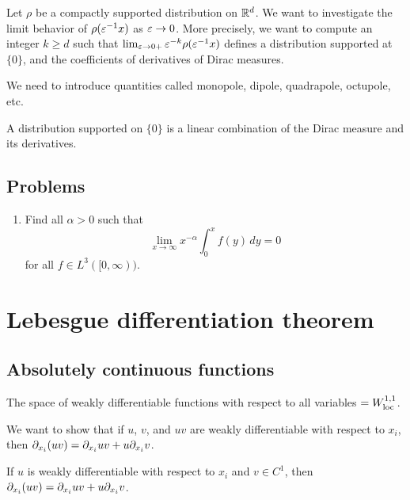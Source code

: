 \documentclass{../../large}
\begin{document}
\begin{prb}
Let $\rho$ be a compactly supported distribution on $\mathbb{R}^d$.
We want to investigate the limit behavior of $\rho(\varepsilon^{-1}x)$ as $\varepsilon\to0$.
More precisely, we want to compute an integer $k\ge d$ such that $\lim_{\varepsilon\to0+}\varepsilon^{-k}\rho(\varepsilon^{-1}x)$ defines a distribution supported at $\{0\}$, and the coefficients of derivatives of Dirac measures.

We need to introduce quantities called monopole, dipole, quadrapole, octupole, etc.
\begin{parts}
\item A distribution supported on $\{0\}$ is a linear combination of the Dirac measure and its derivatives.
\item 
\end{parts}
\end{prb}

\section*{Problems}
\begin{enumerate}
\item Find all $\alpha>0$ such that
\[\lim_{x\to\infty}x^{-\alpha}\int_0^xf(y)\,dy=0\]
for all $f\in L^3([0,\infty))$.
\end{enumerate}
















\chapter{Lebesgue differentiation theorem}


\section{Absolutely continuous functions}

The space of weakly differentiable functions with respect to all variables $=W_{\mathrm{loc}}^{1,1}$.

\begin{prb}
We want to show that if $u$, $v$, and $uv$ are weakly differentiable with respect to $x_i$, then $\pd_{x_i}(uv)=\pd_{x_i}uv+u\pd_{x_i}v$.
\begin{parts}
\item If $u$ is weakly differentiable with respect to $x_i$ and $v\in C^1$, then $\pd_{x_i}(uv)=\pd_{x_i}uv+u\pd_{x_i}v$.
\end{parts}
\end{prb}
\end{document}
